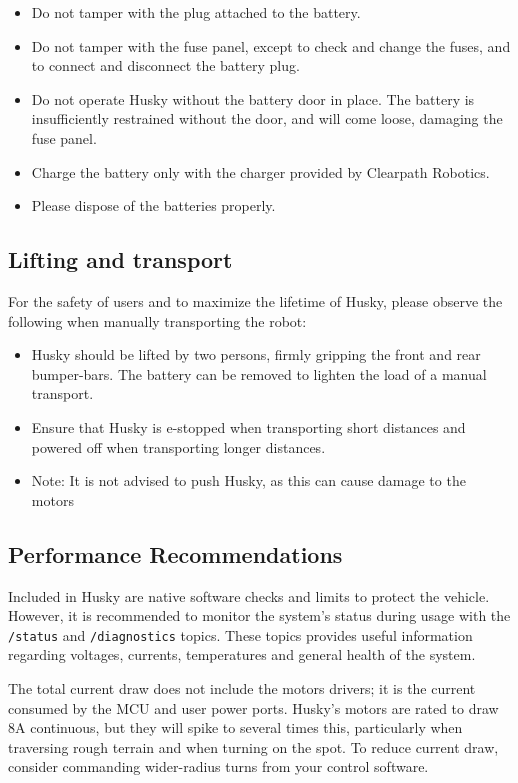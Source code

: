 \documentclass[]{clearpath-latex/clearpath-manual}
\begin{document}
\begin{itemize}
	\item Do not tamper with the plug attached to the battery.
	\item Do not tamper with the fuse panel, except to check and change the fuses, and to connect and disconnect the battery plug.
	\item Do not operate Husky without the battery door in place. The battery is insufficiently restrained without the door, and will come loose, damaging the fuse panel.
	\item Charge the battery only with the charger provided by Clearpath Robotics.
	\item Please dispose of the batteries properly.
\end{itemize}
	
\subsection{Lifting and transport}
For the safety of users and to maximize the lifetime of Husky, please observe the following when manually transporting the robot:

\begin{itemize}
		\item Husky should be lifted by two persons, firmly gripping the front and rear bumper-bars. 
		The battery can be removed to lighten the load of a manual transport.
		\item Ensure that Husky is e-stopped when transporting short distances and powered off when transporting 
		longer distances.
		\item Note: It is not advised to push Husky, as this can cause damage to the motors
\end{itemize}
\newpage
	
\subsection{Performance Recommendations}

Included in Husky are native software checks and limits to protect the vehicle. However, 
it is recommended to monitor the system’s status during usage with the \lstinline{/status} and \lstinline{/diagnostics} topics. 
These topics provides useful information regarding voltages, currents, temperatures and general health of the system.

The total current draw does not include the motors drivers; it is the current consumed by the MCU and user power ports. 
Husky’s motors are rated to draw 8A continuous, but they will spike to several times this, particularly when traversing 
rough terrain and when turning on the spot. To reduce current draw, consider commanding wider-radius turns from 
your control software.
\end{document}
